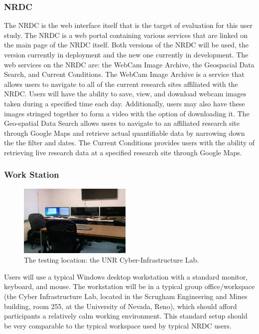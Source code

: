 \documentclass{article}
\begin{document}
\subsubsection{NRDC}
The NRDC is the web interface itself that is the target of evaluation for this user study. The NRDC is a web portal containing various services that are linked on the main page of the NRDC itself. Both versions of the NRDC will be used, the version currently in deployment and the new one currently in development. The web services on the NRDC are: the WebCam Image Archive, the Geospacial Data Search, and Current Conditions. The WebCam Image Archive is a service that allows users to navigate to all of the current research sites affiliated with the NRDC. Users will have the ability to save, view, and download webcam images taken during a specified time each day. Additionally, users may also have these images stringed together to form a video with the option of downloading it. The Geo-spatial Data Search allows users to navigate to an affiliated research site through Google Maps and retrieve actual quantifiable data by narrowing down the the filter and dates. The Current Conditions provides users with the ability of retrieving live research data at a specified research site through Google Maps.

\subsubsection{Work Station}

\begin{figure}
  \begin{center}
    \includegraphics[width=0.48\textwidth]{ci_lab_apparatus}
  \end{center}
  \caption{The testing location: the UNR Cyber-Infrastructure Lab.}
\end{figure}

Users will use a typical Windows desktop workstation with a standard monitor, keyboard, and mouse. The workstation will be in a typical group office/workspace (the Cyber Infrastructure Lab, located in the Scrugham Engineering and Mines building, room 255, at the University of Nevada, Reno), which should afford participants a relatively calm working environment. This standard setup should be very comparable to the typical workspace used by typical NRDC users.
\end{document}

